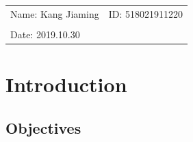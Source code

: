 \documentclass{article}
\begin{document}
\vspace*{0.25cm}

\hrulefill

\thispagestyle{empty}

\begin{center}
\begin{large}
\end{large}

\hrulefill

\vspace*{5cm}
\begin{Large}
\end{Large}

\vspace{2em}

\begin{large}
\end{large}
\end{center}
\vfill

\begin{table}[h!]
\centering
\begin{tabular}{ll}
Name: Kang Jiaming \hspace*{2em}&
ID: 518021911220\hspace*{2em}\\

\\

Date:  2019.10.30

\end{tabular}
\end{table}

\hfill
\newpage

\section{Introduction}

	\subsection{Objectives}
\end{document}
